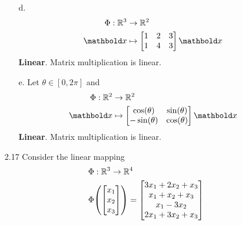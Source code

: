 \documentclass[11pt]{article}
\begin{document}
\begin{enumerate}
\begin{enumerate}
              \item[d.]
                    \[
                        \begin{aligned}
                            \Phi : \R^3 & \rightarrow \R^2 \\
                            \vect{x}    & \mapsto
                            \begin{bmatrix}
                                1 & 2 & 3 \\
                                1 & 4 & 3 \\
                            \end{bmatrix}
                            \vect{x}
                        \end{aligned}
                    \]
                    \textbf{Linear}. Matrix multiplication is linear.

              \item[e.] Let $\theta \in [0, 2\pi]$ and
                    \[
                        \begin{aligned}
                            \Phi : \R^2 & \rightarrow \R^2 \\
                            \vect{x}    & \mapsto
                            \begin{bmatrix}
                                \cos(\theta)  & \sin(\theta) \\
                                -\sin(\theta) & \cos(\theta) \\
                            \end{bmatrix}
                            \vect{x}
                        \end{aligned}
                    \]
                    \textbf{Linear}. Matrix multiplication is linear.

          \end{enumerate}

          \pagebreak

    \item[2.17] Consider the linear mapping
          \[
              \begin{aligned}
                  \Phi & : \mathbb{R}^3 \rightarrow \mathbb{R}^4 \\
                  \Phi & \!\left(
                      \begin{bmatrix}
                          x_1 \\ x_2 \\ x_3
                      \end{bmatrix}
                  \right)
                  = \begin{bmatrix}
                        3x_1 + 2x_2 + x_3 \\
                        x_1 + x_2 + x_3   \\
                        x_1 - 3 x_2       \\
                        2x_1 + 3x_2 + x_3 \\
                    \end{bmatrix}
              \end{aligned}
          \]


\end{enumerate}
\end{document}
